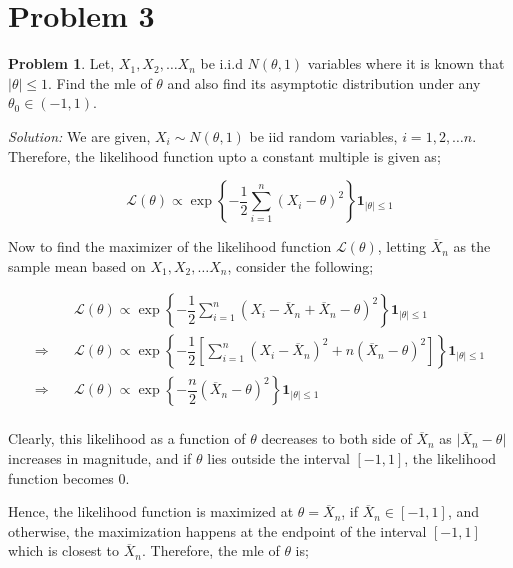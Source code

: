 \documentclass[12pt]{article}
\theoremstyle{definition}
\newtheorem*{prb}{Problem}
\newenvironment{problem}{
\begin{tcolorbox}[colback=blue!5!white,colframe=blue!75!black, parbox = true] \begin{prb}  }{\end{prb}\end{tcolorbox} }
\newenvironment{answer}{\textit{Solution: }\quad }{ \hfill \qedsymbol}
\begin{document}
\section{Problem 3}
\begin{problem}
	Let, $X_1, X_2, \dots X_n$ be i.i.d $N(\theta, 1)$ variables where it is known that $\vert \theta \vert \leq 1$. Find the mle of $\theta$ and also find its asymptotic distribution under any $\theta_0 \in (-1, 1)$.
\end{problem}

\begin{answer}
	We are given, $X_i \sim N(\theta, 1)$ be iid random variables, $i = 1, 2, \dots n$. Therefore, the likelihood function upto a constant multiple is given as;

	\begin{equation}
		\mathcal{L}(\theta) \propto \exp\left\{ -\dfrac{1}{2} \sum_{i=1}^{n} (X_i - \theta)^2 \right\} \bm{1}_{\vert \theta \vert \leq 1}
	\end{equation}

	Now to find the maximizer of the likelihood function $\mathcal{L}(\theta)$, letting $\overline{X}_n$ as the sample mean based on $X_1, X_2, \dots X_n$, consider the following;

	\begin{align*}
		& \mathcal{L}(\theta) \propto \exp\left\{ -\dfrac{1}{2} \sum_{i=1}^{n} (X_i - \overline{X}_n + \overline{X}_n - \theta)^2 \right\} \bm{1}_{\vert \theta \vert \leq 1}\\
		\Rightarrow \quad & \mathcal{L}(\theta) \propto \exp\left\{ -\dfrac{1}{2} \left[\sum_{i=1}^{n} (X_i - \overline{X}_n)^2 + n(\overline{X}_n - \theta)^2 \right] \right\} \bm{1}_{\vert \theta \vert \leq 1}\\
		\Rightarrow \quad & \mathcal{L}(\theta) \propto \exp\left\{ -\dfrac{n}{2} (\overline{X}_n - \theta)^2 \right\} \bm{1}_{\vert \theta \vert \leq 1}\\
	\end{align*}

	Clearly, this likelihood as a function of $\theta$ decreases to both side of $\overline{X}_n$ as $\vert \overline{X}_n - \theta \vert$ increases in magnitude, and if $\theta$ lies outside the interval $[-1, 1]$, the likelihood function becomes $0$.

	Hence, the likelihood function is maximized at $\theta = \overline{X}_n$, if $\overline{X}_n \in [-1, 1]$, and otherwise, the maximization happens at the endpoint of the interval $[-1, 1]$ which is closest to $\overline{X}_n$. Therefore, the mle of $\theta$ is;


\end{answer}
\end{document}
